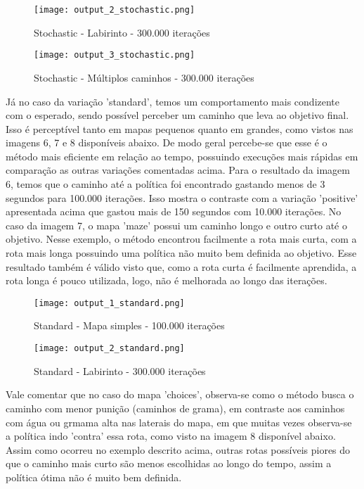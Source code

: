 \documentclass[10pt]{extarticle} %
\begin{document}
\begin{figure}[H]
    \centering
    \texttt{[image: output\_2\_stochastic.png]}
    \caption{Stochastic - Labirinto - 300.000 iterações}
    \label{fig:enter-label}
\end{figure}

\begin{figure}[H]
    \centering
    \texttt{[image: output\_3\_stochastic.png]}
    \caption{Stochastic - Múltiplos caminhos - 300.000 iterações}
    \label{fig:enter-label}
\end{figure}

Já no caso da variação 'standard', temos um comportamento mais condizente com o esperado, sendo possível perceber um caminho que leva ao objetivo final. Isso é perceptível tanto em mapas pequenos quanto em grandes, como vistos nas imagens 6, 7 e 8 disponíveis abaixo. De modo geral percebe-se que esse é o método mais eficiente em relação ao tempo, possuindo execuções mais rápidas em comparação as outras variações comentadas acima. Para o resultado da imagem 6, temos que o caminho até a política foi encontrado gastando menos de 3 segundos para 100.000 iterações. Isso mostra o contraste com a variação 'positive' apresentada acima que gastou mais de 150 segundos com 10.000 iterações. No caso da imagem 7, o mapa 'maze' possui um caminho longo e outro curto até o objetivo. Nesse exemplo, o método encontrou facilmente a rota mais curta, com a rota mais longa possuindo uma política não muito bem definida ao objetivo. Esse resultado também é válido visto que, como a rota curta é facilmente aprendida, a rota longa é pouco utilizada, logo, não é melhorada ao longo das iterações.

\begin{figure}[H]
    \centering
    \texttt{[image: output\_1\_standard.png]}
    \caption{Standard - Mapa simples - 100.000 iterações}
    \label{fig:enter-label}
\end{figure}

\begin{figure}[H]
    \centering
    \texttt{[image: output\_2\_standard.png]}
    \caption{Standard - Labirinto - 300.000 iterações}
    \label{fig:enter-label}
\end{figure}

Vale comentar que no caso do mapa 'choices', observa-se como o método busca o caminho com menor punição (caminhos de grama), em contraste aos caminhos com água ou grmama alta nas laterais do mapa, em que muitas vezes observa-se a política indo 'contra' essa rota, como visto na imagem 8 disponível abaixo. Assim como ocorreu no exemplo descrito acima, outras rotas possíveis piores do que o caminho mais curto são menos escolhidas ao longo do tempo, assim a política ótima não é muito bem definida.
\end{document}

